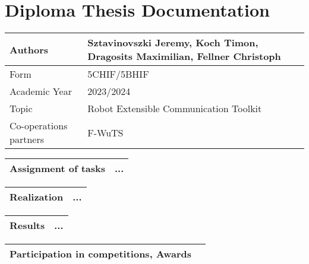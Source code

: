 \chapter{Diploma Thesis Documentation}
\begin{center}
    \begin{tabular}{| m{8cm} | m{8cm} |}
        \hline
        Authors & Sztavinovszki Jeremy, Koch Timon, Dragosits Maximilian, Fellner Christoph\\
        \hline
        Form & 5CHIF/5BHIF\\
        Academic Year & 2023/2024\\
        \hline
        Topic & Robot Extensible Communication Toolkit\\
        \hline
        Co-operations partners & F-WuTS\\
        \hline
    \end{tabular}
    
    \vspace{5mm}
    
    \begin{tabular}{| m{8cm} | m{8cm} |}
        \hline
        Assignment of tasks & ...\\ %
        \hline
    \end{tabular}
    
    \vspace{5mm}
    
    \begin{tabular}{| m{8cm} | m{8cm} |}
        \hline
        Realization & ...\\ %
        \hline
    \end{tabular}
    
    \vspace{5mm}
    
    \begin{tabular}{| m{8cm} | m{8cm} |}
        \hline
        Results & ...\\ %
        \hline
    \end{tabular}
    
    \vspace{5mm}
    
    \begin{tabular}{| m{8cm} | m{8cm} |}
        \hline
        Participation in competitions, Awards & \\ 
        \hline
    \end{tabular}
    

\end{center}
